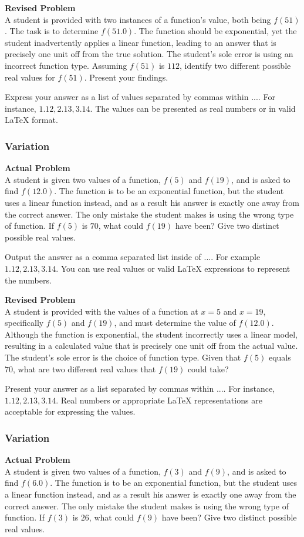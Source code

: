 \textbf{Revised Problem}\\
A student is provided with two instances of a function's value, both being $f(51)$. The task is to determine $f(51.0)$. The function should be exponential, yet the student inadvertently applies a linear function, leading to an answer that is precisely one unit off from the true solution. The student's sole error is using an incorrect function type. Assuming $f(51)$ is $112$, identify two different possible real values for $f(51)$. Present your findings.

Express your answer as a list of values separated by commas within $\boxed{...}$. For instance, $\boxed{1.12, 2.13, 3.14}$. The values can be presented as real numbers or in valid LaTeX format.

\subsubsection{Variation}
\textbf{Actual Problem}\\
A student is given two values of a function, $f(5)$ and $f(19)$, and is asked to find $f(12.0)$. The function is to be an exponential function, but the student uses a linear function instead, and as a result his answer is exactly one away from the correct answer. The only mistake the student makes is using the wrong type of function. If $f(5)$ is $70$, what could $f(19)$ have been? Give two distinct possible real values.

Output the answer as a comma separated list inside of $\boxed{...}$. For example $\boxed{1.12, 2.13, 3.14}$. You can use real values or valid LaTeX expressions to represent the numbers.

\textbf{Revised Problem}\\
A student is provided with the values of a function at $x = 5$ and $x = 19$, specifically $f(5)$ and $f(19)$, and must determine the value of $f(12.0)$. Although the function is exponential, the student incorrectly uses a linear model, resulting in a calculated value that is precisely one unit off from the actual value. The student's sole error is the choice of function type. Given that $f(5)$ equals $70$, what are two different real values that $f(19)$ could take?

Present your answer as a list separated by commas within $\boxed{...}$. For instance, $\boxed{1.12, 2.13, 3.14}$. Real numbers or appropriate LaTeX representations are acceptable for expressing the values.

\subsubsection{Variation}
\textbf{Actual Problem}\\
A student is given two values of a function, $f(3)$ and $f(9)$, and is asked to find $f(6.0)$. The function is to be an exponential function, but the student uses a linear function instead, and as a result his answer is exactly one away from the correct answer. The only mistake the student makes is using the wrong type of function. If $f(3)$ is $26$, what could $f(9)$ have been? Give two distinct possible real values.

